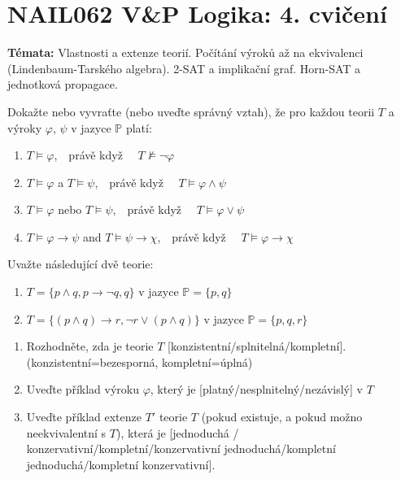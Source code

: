 \documentclass[a4paper,12pt]{article}
\begin{document}
\section*{NAIL062 V\&P Logika: 4. cvičení}


\textbf{Témata:} 
Vlastnosti a extenze teorií. Počítání výroků až na ekvivalenci (Lindenbaum-Tarského algebra). 2-SAT a implikační graf. Horn-SAT a jednotková propagace.



\medskip\begin{problem}
    Dokažte nebo vyvraťte (nebo uveďte správný vztah), že pro každou teorii $T$ a výroky $\varphi$, $\psi$ v jazyce $\mathbb{P}$ platí:
    \begin{enumerate}
        \item $T \models \varphi$,\ \  právě když \ \ $T \not\models \neg \varphi$
        \item $T \models \varphi$ a $T \models \psi$,\ \ právě když \ \ $T \models \varphi \wedge \psi$
        \item $T \models \varphi$ nebo $T \models \psi$,\ \ právě když \ \ $T \models \varphi \vee \psi$
        \item $T \models \varphi \to \psi$ and $T \models \psi \to \chi$,\ \ právě když \ \ $T \models \varphi \to \chi$
    \end{enumerate}
    \end{problem}

\medskip\begin{problem}
    Uvažte následující dvě teorie:
    \begin{enumerate}[label=(\Roman*)]
        \item $T=\{p\wedge q,p\to\neg q,q\}$ v jazyce $\mathbb P=\{p,q\}$
        \item $T=\{(p\wedge q)\to r, \neg r\vee(p\wedge q)\}$ v jazyce $\mathbb P=\{p,q,r\}$        
    \end{enumerate}
    \begin{enumerate}
        \item Rozhodněte, zda je teorie $T$ [konzistentní/splnitelná/kompletní]. (konzistentní=bezesporná, kompletní=úplná)
        \item Uveďte příklad výroku $\varphi$, který je [platný/nesplnitelný/nezávislý] v $T$
        \item Uveďte příklad extenze $T'$ teorie $T$ (pokud existuje, a pokud možno neekvivalentní s $T$), která je [jednoduchá / konzervativní/kompletní/konzervativní jednoduchá/kompletní jednoduchá/kompletní konzervativní].
    \end{enumerate}
    
    \end{problem}
\end{document}
